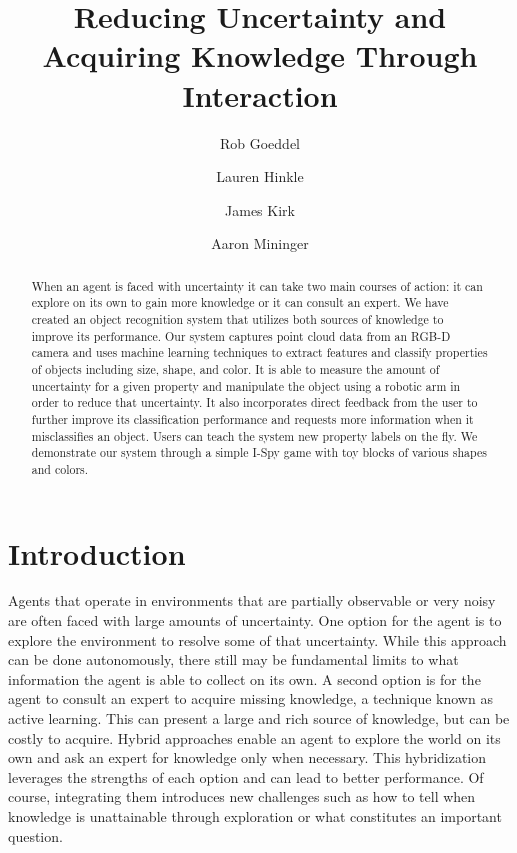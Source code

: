 \documentclass[11pt]{article}
\title{Reducing Uncertainty and Acquiring Knowledge Through Interaction}
\author{Rob Goeddel \and Lauren Hinkle \and James Kirk \and Aaron Mininger}
\date{}
\newcommand{\xxx}[1]{{\bf \color{red} #1}}
\begin{document}
\maketitle


\begin{abstract}
When an agent is faced with uncertainty it can take two main courses of action: it
can explore on its own to gain more knowledge or it can consult an expert. We
have created an object recognition system that utilizes both sources of
knowledge to improve its performance. Our system captures point cloud data
from an RGB-D camera and uses machine learning techniques to extract features
and classify properties of objects including size, shape, and color. It is
able to measure the amount of uncertainty for a given property and manipulate
the object using a robotic arm in order to reduce that uncertainty. It also
incorporates direct feedback from the user to further improve its
classification performance and requests more information when it misclassifies
an object. Users can teach the system new property labels on the fly.
We demonstrate our system through a simple I-Spy game with toy blocks of
various shapes and colors.
\end{abstract}


\section{Introduction}
Agents that operate in environments that are partially observable or very
noisy are often faced with large amounts of uncertainty. One option for the
agent is to explore the environment to resolve some of that uncertainty. While
this approach can be done autonomously, there
still may be fundamental limits to what information the agent is able to
collect on its own. A second option is for the agent to consult an expert to acquire
missing knowledge, a technique known as active learning. This can present a
large and rich source of knowledge, but can be costly to acquire. Hybrid
approaches enable an agent to explore the world on its own and ask an expert
for knowledge only when necessary. This hybridization leverages the
strengths of each option and can lead to better performance. Of course,
          integrating them introduces new challenges such as how to tell when
          knowledge is unattainable through exploration or what constitutes an
          important question.
\end{document}
